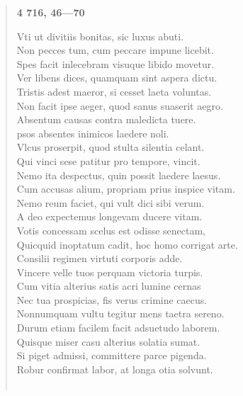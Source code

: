 \documentclass[11pt, a4paper]{report}
\begin{document}
\begin{verse}
     \marginpar{[181]} \begin{center} \textbf{4 716, 46—70} \end{center}Vti ut divitiis bonitas, sic luxus abuti. \\ Non pecces tum, cum peccare impune licebit. \\ Spes facit inlecebram visuque libido movetur. \\ Ver libens dices, quamquam sint aspera dictu. \\ Tristis adest maeror, si cesset laeta voluntas. \\ Non facit ipse aeger, quod sanus suaserit aegro. \\ Absentum causas contra maledicta tuere. \\ psos absentes inimicos laedere noli. \\ Vlcus proserpit, quod stulta silentia celant. \\ Qui vinci sese patitur pro tempore, vincit. \\ Nemo ita despectus, quin possit laedere laesus. \\ Cum accusas alium, propriam prius inspice vitam. \\ Nemo reum faciet, qui vult dici sibi verum. \\ A deo expectemus longevam ducere vitam. \\ Votis concessam scelus est odisse senectam, \\ Quicquid inoptatum cadit, hoc homo corrigat arte. \\ Consilii regimen virtuti corporis adde. \\ Vincere velle tuos perquam victoria turpis. \\ Cum vitia alterius satis acri lumine cernas \\ Nec tua prospicias, fis verus crimine caecus. \\ Nonnumquam vultu tegitur mens taetra sereno. \\ Durum etiam facilem facit adsuetudo laborem. \\ Quisque miser casu alterius solatia sumat. \\ Si piget admissi, committere parce pigenda. \\ Robur confirmat labor, at longa otia solvunt. \\ 
        ﻿\pagebreak 

\end{verse}
\end{document}
